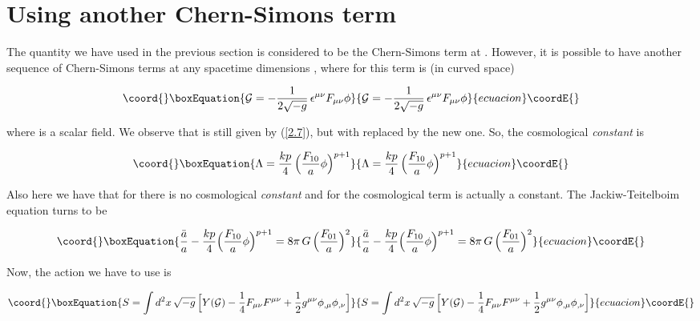 \documentclass[a4paper,twocolumn,prd,groupedaddress,nofootinbib,showpacs]
{revtex4}
\begin{document}
\section{Using another Chern-Simons term}
\renewcommand{\theequation}{4.\arabic{equation}}
\setcounter{equation}{0}

The quantity we have used in the previous section is considered to be
the Chern-Simons term at \coordHE{}. However, it is possible to have
another sequence of Chern-Simons terms at any spacetime dimensions
\cite{Barcelos}, where for \coordHE{} this term is (in curved space)

\begin{equation}\coord{}\boxEquation{
{\cal G}=-\frac{1}{2\sqrt{-g}}\,\epsilon^{\mu\nu}F_{\mu\nu}\phi
\label{4.1}
}{
{\cal G}=-\frac{1}{2\sqrt{-g}}\,\epsilon^{\mu\nu}F_{\mu\nu}\phi
}{ecuacion}\coordE{}\end{equation}

\noindent
where \myHighlight{$\phi$}\coordHE{} is a scalar field. We observe that \coordHE{}
is still given by (\ref{2.7}), but with \coordHE{} replaced by the new
one. So, the cosmological {\it constant} is

\begin{equation}\coord{}\boxEquation{
\Lambda=\frac{kp}{4}\,\Bigl(\frac{F_{10}}{a}\phi\Bigr)^{p+1}
\label{4.2}
}{
\Lambda=\frac{kp}{4}\,\Bigl(\frac{F_{10}}{a}\phi\Bigr)^{p+1}
}{ecuacion}\coordE{}\end{equation}

\noindent
Also here we have that for \coordHE{} there is no cosmological {\it
constant} and for \coordHE{} the cosmological term is actually a constant.
The Jackiw-Teitelboim equation turns to be

\begin{equation}\coord{}\boxEquation{
\frac{\ddot a}{a}
-\frac{kp}{4}\Bigl(\frac{F_{10}}{a}\phi\Bigr)^{p+1}
=8\pi\,G\,\Bigl(\frac{F_{01}}{a}\Bigr)^2
\label{4.3}
}{
\frac{\ddot a}{a}
-\frac{kp}{4}\Bigl(\frac{F_{10}}{a}\phi\Bigr)^{p+1}
=8\pi\,G\,\Bigl(\frac{F_{01}}{a}\Bigr)^2
}{ecuacion}\coordE{}\end{equation}

Now, the action we have to use is

\begin{equation}\coord{}\boxEquation{
S=\int d^2x\,\sqrt{-g}\,\Bigl[Y({\cal G})
-\frac{1}{4}F_{\mu\nu}F^{\mu\nu}
+\frac{1}{2}g^{\mu\nu}\phi_{,\mu}\phi_{,\nu}\Bigr]
\label{4.4}
}{
S=\int d^2x\,\sqrt{-g}\,\Bigl[Y({\cal G})
-\frac{1}{4}F_{\mu\nu}F^{\mu\nu}
+\frac{1}{2}g^{\mu\nu}\phi_{,\mu}\phi_{,\nu}\Bigr]
}{ecuacion}\coordE{}\end{equation}
\end{document}
